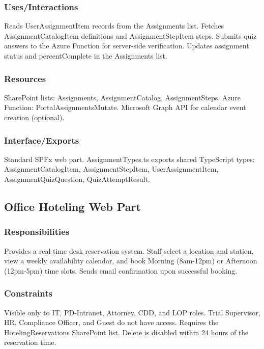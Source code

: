 \documentclass[12pt]{article}
\begin{document}
\subsubsection{Uses/Interactions}

Reads UserAssignmentItem records from the Assignments list. Fetches AssignmentCatalogItem definitions and AssignmentStepItem steps. Submits quiz answers to the Azure Function for server-side verification. Updates assignment status and percentComplete in the Assignments list.

\subsubsection{Resources}

SharePoint lists: Assignments, AssignmentCatalog, AssignmentSteps. Azure Function: PortalAssignmentsMutate. Microsoft Graph API for calendar event creation (optional).

\subsubsection{Interface/Exports}

Standard SPFx web part. AssignmentTypes.ts exports shared TypeScript types: AssignmentCatalogItem, AssignmentStepItem, UserAssignmentItem, AssignmentQuizQuestion, QuizAttemptResult.

\subsection{Office Hoteling Web Part}

\subsubsection{Responsibilities}

Provides a real-time desk reservation system. Staff select a location and station, view a weekly availability calendar, and book Morning (8am-12pm) or Afternoon (12pm-5pm) time slots. Sends email confirmation upon successful booking.

\subsubsection{Constraints}

Visible only to IT, PD-Intranet, Attorney, CDD, and LOP roles. Trial Supervisor, HR, Compliance Officer, and Guest do not have access. Requires the HotelingReservations SharePoint list. Delete is disabled within 24 hours of the reservation time.
\end{document}
